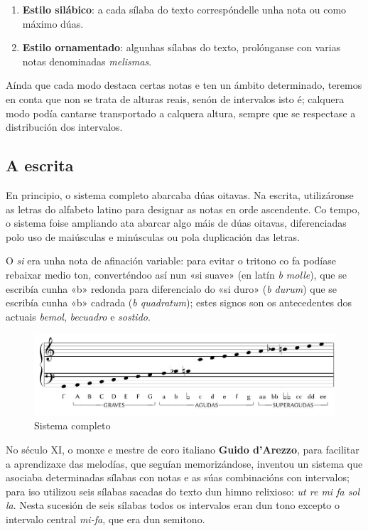 \documentclass[spanish, a4paper,nobind]{templates/ociamthesis}
\providecommand{\tightlist}{%
  \setlength{\itemsep}{0pt}\setlength{\parskip}{0pt}}
\begin{document}
\begin{enumerate}
\def\labelenumi{\arabic{enumi}.}
\tightlist
\item
  \textbf{Estilo silábico}: a cada sílaba do texto correspóndelle unha nota ou como máximo dúas.
\item
  \textbf{Estilo ornamentado}: algunhas sílabas do texto, prolónganse con varias notas denominadas \emph{melismas}.
\end{enumerate}

Aínda que cada modo destaca certas notas e ten un ámbito determinado, teremos en conta que non se trata de alturas reais, senón de intervalos isto é; calquera modo podía cantarse transportado a calquera altura, sempre que se respectase a distribución dos intervalos.

\hypertarget{a-escrita}{%
\subsection*{A escrita}\label{a-escrita}}

En principio, o sistema completo abarcaba dúas oitavas. Na escrita, utilizáronse as letras do alfabeto latino para designar as notas en orde ascendente. Co tempo, o sistema foise ampliando ata abarcar algo máis de dúas oitavas, diferenciadas polo uso de maiúsculas e minúsculas ou pola duplicación das letras.

O \emph{si} era unha nota de afinación variable: para evitar o tritono co fa podíase rebaixar medio ton, converténdoo así nun «si suave» (en latín \emph{b molle}), que se escribía cunha «b» redonda para diferencialo do «si duro» (\emph{b durum}) que se escribía cunha «b» cadrada (\emph{b quadratum}); estes signos son os antecedentes dos actuais \emph{bemol}, \emph{becuadro} e \emph{sostido}.

\begin{figure}
\centering
\includegraphics{figures/ud-03/sistemaCompleto.jpg}
\caption{Sistema completo}
\end{figure}

No século XI, o monxe e mestre de coro italiano \textbf{Guido d'Arezzo}, para facilitar a aprendizaxe das melodías, que seguían memorizándose, inventou un sistema que asociaba determinadas sílabas con notas e as súas combinacións con intervalos; para iso utilizou seis sílabas sacadas do texto dun himno relixioso: \emph{ut re mi fa sol la}. Nesta sucesión de seis sílabas todos os intervalos eran dun tono excepto o intervalo central \emph{mi-fa}, que era dun semitono.
\end{document}
